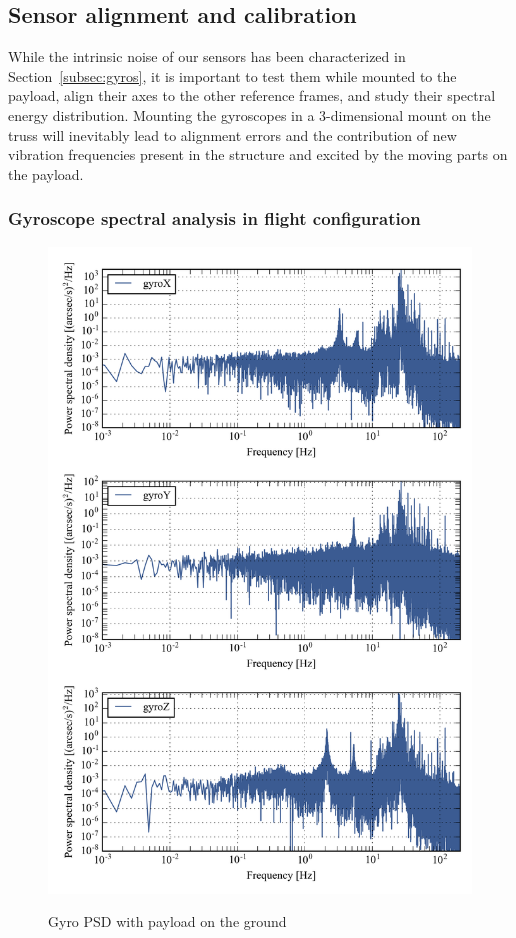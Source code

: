 \subsection{Sensor alignment and calibration}
While the intrinsic noise of our sensors has been characterized in Section~\ref{subsec:gyros}, it is important to test them while mounted to the payload, align their axes to the other reference frames, and study their spectral energy distribution. Mounting the gyroscopes in a 3-dimensional mount on the truss will inevitably lead to alignment errors and the contribution of new vibration frequencies present in the structure and excited by the moving parts on the payload.


\subsubsection{Gyroscope spectral analysis in flight configuration}

\begin{figure}[!h]
\begin{center}
\includegraphics[width=\textwidth]{Figures/multiPSD400.png}
\label{fig:multiPSD400}
\vspace{-0.5cm}
\caption[Gyro PSD with payload on the ground]{Gyro PSD with payload on the ground}
\end{center}
\end{figure}


